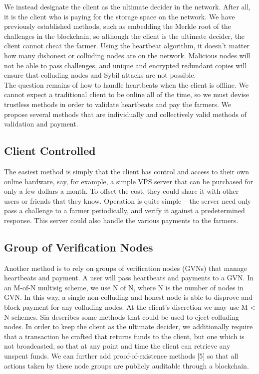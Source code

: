\documentclass[a4paper,10pt]{article}
\begin{document}
We instead designate the client as the ultimate decider in the network. After all, it is the client who is paying for the storage space on the network. We have previously established methods, such as embedding the Merkle root of the challenges in the blockchain, so although the client is the ultimate decider, the client cannot cheat the farmer. Using the heartbeat algorithm, it doesn’t matter how many dishonest or colluding nodes are on the network. Malicious nodes will not be able to pass challenges, and unique and encrypted redundant copies will ensure that colluding nodes and Sybil attacks are not possible. \\

The question remains of how to handle heartbeats when the client is offline. We cannot expect a traditional client to be online all of the time, so we must devise trustless methods in order to validate heartbeats and pay the farmers. We propose several methods that are individually and collectively valid methods of validation and payment. \\

\subsection{Client Controlled}
The easiest method is simply that the client has control and access to their own online hardware, say, for example, a simple VPS server that can be purchased for only a few dollars a month. To offset the cost, they could share it with other users or friends that they know. Operation is quite simple -- the server need only pass a challenge to a farmer periodically, and verify it against a predetermined response. This server could also handle the various payments to the farmers.

\subsection{Group of Verification Nodes}
Another method is to rely on groups of verification nodes (GVNs) that manage heartbeats and payment. A user will pass heartbeats and payments to a GVN. In an M-of-N multisig scheme, we use N of N, where N is the number of nodes in GVN. In this way, a single non-colluding and honest node is able to disprove and block payment for any colluding nodes. At the client’s discretion we may use M < N schemes. Sia \cite{20} describes some methods that could be used to eject colluding nodes. In order to keep the client as the ultimate decider, we additionally require that a transaction be crafted that returns funds to the client, but one which is not broadcasted, so that at any point and time the client can retrieve any unspent funds. We can further add proof-of-existence methods \cite{4} [5] \cite{7} so that all actions taken by these node groups are publicly auditable through a blockchain. 
\end{document}
